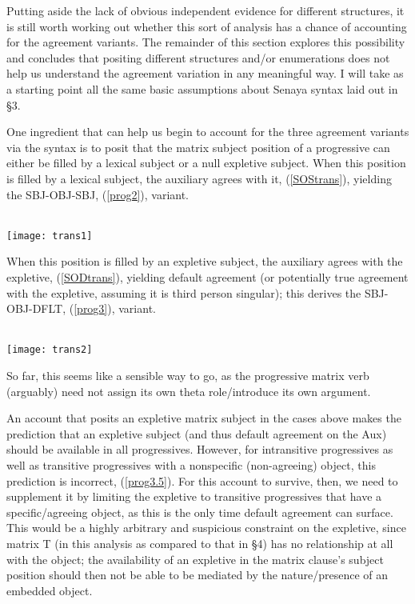 \documentclass[output=paper
,modfonts
,nonflat]{langsci/langscibook}
\begin{document}
Putting aside the lack of obvious independent evidence for different structures, it is still worth working out whether this sort of analysis has a chance of accounting for the agreement variants. The remainder of this section explores this possibility and concludes that positing different structures and/or enumerations does not help us understand the agreement variation in any meaningful way. I will take as a starting point all the same basic assumptions about Senaya syntax laid out in \S3. 

One ingredient that can help us begin to account for the three agreement variants via the syntax is to posit that the matrix subject position of a progressive can either be filled by a lexical subject or a null expletive subject. When this position is filled by a lexical subject, the auxiliary agrees with it, (\ref{SOStrans}), yielding the SBJ-OBJ-SBJ, (\ref{prog2}), variant.

\ea \label{SOStrans} \- \\ \texttt{[image: trans1]}
\z

\noindent When this position is filled by an expletive subject, the auxiliary agrees with the expletive, (\ref{SODtrans}),  yielding default agreement (or potentially true agreement with the expletive, assuming it is third person singular); this derives the SBJ-OBJ-DFLT, (\ref{prog3}), variant.

\ea \label{SODtrans} \- \\ \texttt{[image: trans2]}
\z

\noindent So far, this seems like a sensible way to go, as the progressive matrix verb (arguably) need not assign its own theta role/introduce its own argument.

An account that posits an expletive matrix subject in the cases above makes the prediction that an expletive subject (and thus default agreement on the Aux) should be available in all progressives. However, for intransitive progressives as well as transitive progressives with a nonspecific (non-agreeing) object, this prediction is incorrect, (\ref{prog3.5}). For this account to survive, then, we need to supplement it by limiting the expletive to transitive progressives that have a specific/agreeing object, as this is the only time default agreement can surface. This would be a highly arbitrary and suspicious constraint on the expletive, since matrix T (in this analysis as compared to that in \S4) has no relationship at all with the object; the availability of an expletive in the matrix clause's subject position should then not be able to be mediated by the nature/presence of an embedded object.
\end{document}
